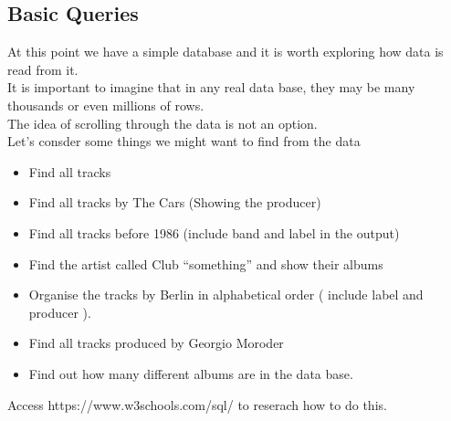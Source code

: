 \documentclass[a4paper,12pt]{article}
\begin{document}
\subsection{Basic Queries}
At this point we have a simple database and it is worth exploring how data is read from it.\\
It is important to imagine that in any real data base, they may be many thousands or even millions of rows.\\
The idea of scrolling through the data is not an option.\\
Let's consder some things we might want to find from the data
\begin{itemize}
	\item Find all tracks
	\item Find all tracks by The Cars (Showing the producer)
	\item Find all tracks before 1986 (include band and label in the output)
	\item Find the artist called Club ``something'' and show their albums 
	\item Organise the tracks by Berlin in alphabetical order ( include label and producer ).
	\item Find all tracks produced by Georgio Moroder
	\item Find out how many different albums are in the data base.
\end{itemize}
Access https://www.w3schools.com/sql/ to reserach how to do this. 









\end{document}
